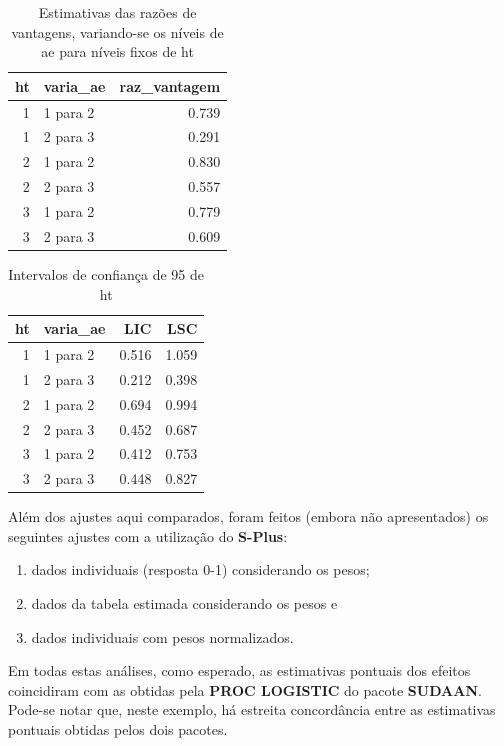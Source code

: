 \documentclass[]{book}
\numberwithin{example}{chapter}
\numberwithin{remark}{chapter}
\numberwithin{definition}{chapter}
\begin{document}
\begin{table}

\caption{\label{tab:razvant}Estimativas das razões de vantagens, variando-se os níveis de ae para níveis fixos
  de ht}
\centering
\begin{tabular}[t]{rlr}
\toprule
ht & varia\_ae & raz\_vantagem\\
\midrule
1 & 1 para 2 & 0.739\\
1 & 2 para 3 & 0.291\\
2 & 1 para 2 & 0.830\\
2 & 2 para 3 & 0.557\\
3 & 1 para 2 & 0.779\\
3 & 2 para 3 & 0.609\\
\bottomrule
\end{tabular}
\end{table}

\begin{table}

\caption{\label{tab:icvant}Intervalos de confiança de 95%
  de ht}
\centering
\begin{tabular}[t]{rlrr}
\toprule
ht & varia\_ae & LIC & LSC\\
\midrule
1 & 1 para 2 & 0.516 & 1.059\\
1 & 2 para 3 & 0.212 & 0.398\\
2 & 1 para 2 & 0.694 & 0.994\\
2 & 2 para 3 & 0.452 & 0.687\\
3 & 1 para 2 & 0.412 & 0.753\\
3 & 2 para 3 & 0.448 & 0.827\\
\bottomrule
\end{tabular}
\end{table}

Além dos ajustes aqui comparados, foram feitos (embora não apresentados)
os seguintes ajustes com a utilização do \textbf{S-Plus}:

\begin{enumerate}
\def\labelenumi{\arabic{enumi})}
\item
  dados individuais (resposta 0-1) considerando os pesos;
\item
  dados da tabela estimada considerando os pesos e
\item
  dados individuais com pesos normalizados.
\end{enumerate}

Em todas estas análises, como esperado, as estimativas pontuais dos
efeitos coincidiram com as obtidas pela \textbf{PROC LOGISTIC} do pacote
\textbf{SUDAAN}. Pode-se notar que, neste exemplo, há estreita
concordância entre as estimativas pontuais obtidas pelos dois pacotes.
\end{document}
